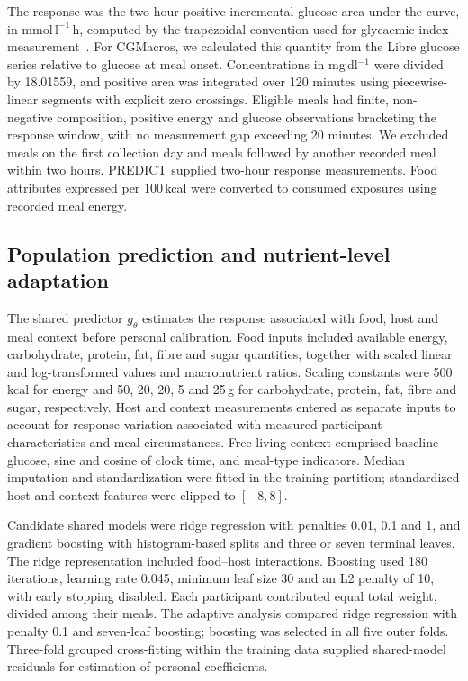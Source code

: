 \documentclass[pdflatex,sn-nature]{sn-jnl}
\newcommand{\aucunit}{\mathrm{mmol\,l^{-1}\,h}}
\theoremstyle{thmstyleone}
\theoremstyle{thmstyletwo}
\theoremstyle{thmstylethree}
\begin{document}
The response was the two-hour positive incremental glucose area under the curve, in $\aucunit$, computed by the trapezoidal convention used for glycaemic index measurement~\cite{wolever2004}. For CGMacros, we calculated this quantity from the Libre glucose series relative to glucose at meal onset. Concentrations in mg\,dl$^{-1}$ were divided by 18.01559, and positive area was integrated over 120 minutes using piecewise-linear segments with explicit zero crossings. Eligible meals had finite, non-negative composition, positive energy and glucose observations bracketing the response window, with no measurement gap exceeding 20 minutes. We excluded meals on the first collection day and meals followed by another recorded meal within two hours. PREDICT supplied two-hour response measurements. Food attributes expressed per 100\,kcal were converted to consumed exposures using recorded meal energy.

\subsection{Population prediction and nutrient-level adaptation}

The shared predictor $g_\theta$ estimates the response associated with food, host and meal context before personal calibration. Food inputs included available energy, carbohydrate, protein, fat, fibre and sugar quantities, together with scaled linear and log-transformed values and macronutrient ratios. Scaling constants were 500\,kcal for energy and 50, 20, 20, 5 and 25\,g for carbohydrate, protein, fat, fibre and sugar, respectively. Host and context measurements entered as separate inputs to account for response variation associated with measured participant characteristics and meal circumstances. Free-living context comprised baseline glucose, sine and cosine of clock time, and meal-type indicators. Median imputation and standardization were fitted in the training partition; standardized host and context features were clipped to $[-8,8]$.

Candidate shared models were ridge regression with penalties 0.01, 0.1 and 1, and gradient boosting with histogram-based splits and three or seven terminal leaves. The ridge representation included food--host interactions. Boosting used 180 iterations, learning rate 0.045, minimum leaf size 30 and an L2 penalty of 10, with early stopping disabled. Each participant contributed equal total weight, divided among their meals. The adaptive analysis compared ridge regression with penalty 0.1 and seven-leaf boosting; boosting was selected in all five outer folds. Three-fold grouped cross-fitting within the training data supplied shared-model residuals for estimation of personal coefficients.
\end{document}
